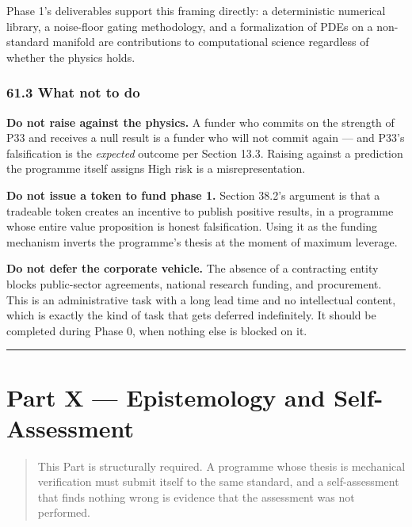\documentclass[
  11pt]{report}
\begin{document}
Phase 1's deliverables support this framing directly: a deterministic
numerical library, a noise-floor gating methodology, and a formalization
of PDEs on a non-standard manifold are contributions to computational
science regardless of whether the physics holds.

\hypertarget{what-not-to-do}{%
\section{61.3 What not to do}\label{what-not-to-do}}

\textbf{Do not raise against the physics.} A funder who commits on the
strength of P33 and receives a null result is a funder who will not
commit again --- and P33's falsification is the \emph{expected} outcome
per Section 13.3. Raising against a prediction the programme itself
assigns High risk is a misrepresentation.

\textbf{Do not issue a token to fund phase 1.} Section 38.2's argument
is that a tradeable token creates an incentive to publish positive
results, in a programme whose entire value proposition is honest
falsification. Using it as the funding mechanism inverts the programme's
thesis at the moment of maximum leverage.

\textbf{Do not defer the corporate vehicle.} The absence of a
contracting entity blocks public-sector agreements, national research
funding, and procurement. This is an administrative task with a long
lead time and no intellectual content, which is exactly the kind of task
that gets deferred indefinitely. It should be completed during Phase 0,
when nothing else is blocked on it.

\begin{center}\rule{0.5\linewidth}{0.5pt}\end{center}

\hypertarget{part-x-epistemology-and-self-assessment}{%
\part{Part X --- Epistemology and
Self-Assessment}\label{part-x-epistemology-and-self-assessment}}

\begin{quote}
This Part is structurally required. A programme whose thesis is
mechanical verification must submit itself to the same standard, and a
self-assessment that finds nothing wrong is evidence that the assessment
was not performed.
\end{quote}
\end{document}
